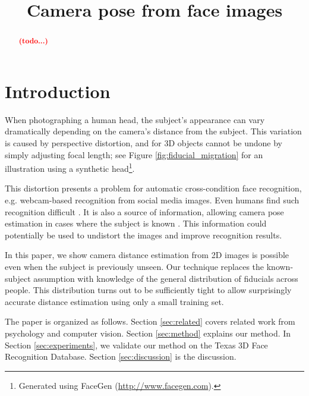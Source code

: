 \documentclass[runningheads]{llncs}
\newcommand {\afbnote} [1] {{\bf \textcolor{red}{(#1)}}}
\begin{document}
\pagestyle{headings}

\mainmatter

\title{Camera pose from face images}


\maketitle

\begin{abstract}
\afbnote{todo...}
\end{abstract}

\section{Introduction}
When photographing a human head, the subject's appearance can vary dramatically depending on the camera's distance from the subject.
This variation is caused by perspective distortion, and for 3D objects cannot be undone by simply adjusting focal length; see Figure \ref{fig:fiducial_migration} for an illustration using a synthetic head\footnote{Generated using FaceGen (\url{http://www.facegen.com}).}.

This distortion presents a problem for automatic cross-condition face recognition, e.g. webcam-based recognition from social media images.
Even humans find such recognition difficult \cite{liu2003face,liu2006face}.
It is also a source of information, allowing camera pose estimation in cases where the subject is known \cite{ohayon2006robust}.
This information could potentially be used to undistort the images and improve recognition results.

In this paper, we show camera distance estimation from 2D images is possible even when the subject is previously unseen.
Our technique replaces the known-subject assumption with knowledge of the general distribution of fiducials across people.
This distribution turns out to be sufficiently tight to allow surprisingly accurate distance estimation using only a small training set.

The paper is organized as follows.
Section \ref{sec:related} covers related work from psychology and computer vision.
Section \ref{sec:method} explains our method.
In Section \ref{sec:experiments}, we validate our method on the Texas 3D Face Recognition Database.
Section \ref{sec:discussion} is the discussion.
\end{document}
